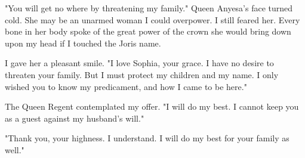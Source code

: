 \documentclass{article}
\begin{document}
"You will get no where by threatening my family." Queen Anyesa's face turned cold. She may be an unarmed woman I could overpower. I still feared her. Every bone in her body spoke of the great power of the crown she would bring down upon my head if I touched the Joris name.

I gave her a pleasant smile. "I love Sophia, your grace. I have no desire to threaten your family. But I must protect my children and my name. I only wished you to know my predicament, and how I came to be here."

The Queen Regent contemplated my offer. "I will do my best. I cannot keep you as a guest against my husband's will."

"Thank you, your highness. I understand. I will do my best for your family as well."


\begin{comment}
Would your neice like to visit him?"

I watched the Queen Regent stiffen, then put Lyca down carefully on his cot. "Why do you ask?" 

I did my best to smile before her cold eyes. The Queen Regent did not involve herself in matters of Marsea's policy, but she held the court together at her will. I understood why. I would not easily wish to endure her anger or mistrust again. "We are both mothers, your highness. News of Lucretious's fragile health cannot be easy for her."

When she passed her eyes over my body, I felt that she stripped me naked, not only of clothes, but of my flesh as well, to examine the soul the Maker had given me. "What is the price of your mother's generosity, your grace?"

"I wish for General Romino to become the ambassador to Lir, your highness."

"The drunken fighter?" Queen Anyesa laughed. "My husband has decided to send him to Turina."

"I am aware of his decision, your highness, which is why I ask you. I am doing my best for Lucretious, but he is fragile, as you see. It would be a pity for him to never see his mother."

The queen unleashed a cold contained fury upon my small uncertain person. "You are threatening me?"

I do not know what inner courage prevented me from quivering at her question. "You misunderstand me, your highness. I have grown fond of Lucretious. I will give him no reason to doubt that he is my own. I have also experienced the pain of being separated from my children. I would not wish it upon any mother."


\end{comment}
\end{document}
